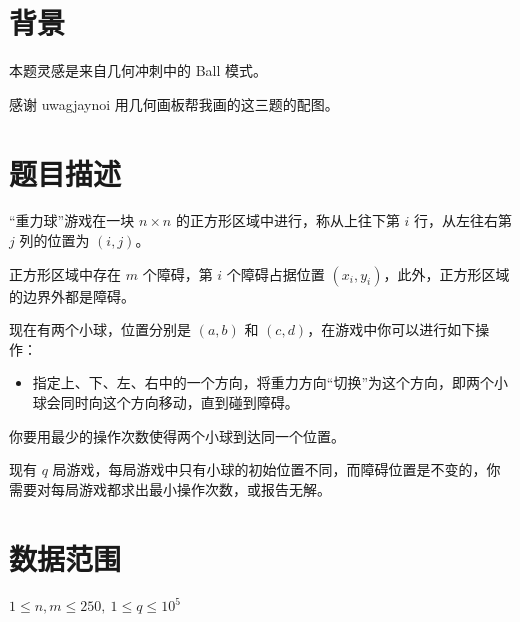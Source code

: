 \documentclass[a4paper,10pt]{article}
\begin{document}
\newpage

\section*{背景}

本题灵感是来自几何冲刺中的 Ball 模式。

感谢 uwagjaynoi 用几何画板帮我画的这三题的配图。

\section*{题目描述}

“重力球”游戏在一块 $n\times n$ 的正方形区域中进行，称从上往下第 $i$ 行，从左往右第 $j$ 列的位置为 $(i,j)$。

正方形区域中存在 $m$ 个障碍，第 $i$ 个障碍占据位置 $(x_i,y_i)$，此外，正方形区域的边界外都是障碍。

现在有两个小球，位置分别是 $(a,b)$ 和 $(c,d)$，在游戏中你可以进行如下操作：

\begin{itemize}
\item 指定上、下、左、右中的一个方向，将重力方向“切换”为这个方向，即两个小球会同时向这个方向移动，直到碰到障碍。
\end{itemize}

你要用最少的操作次数使得两个小球到达同一个位置。

现有 $q$ 局游戏，每局游戏中只有小球的初始位置不同，而障碍位置是不变的，你需要对每局游戏都求出最小操作次数，或报告无解。

\section*{数据范围}

$1\leq n,m\leq 250,\ 1\leq q\leq 10^5$

\newpage
\end{document}
